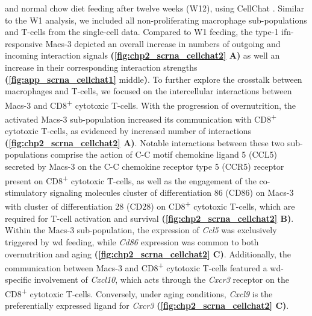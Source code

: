 and normal chow diet feeding after twelve weeks (W12), using CellChat \textbf{\cite{jin_cellchat_2023}}. Similar to the W1 analysis, we included all non-proliferating macrophage sub-populations and T-cells from the single-cell data. Compared to W1 feeding, the type-1 \gls{ifn}-responsive Macs-3 depicted an overall increase in numbers of outgoing and incoming interaction signals \textbf{(\autoref{fig:chp2_scrna_cellchat2} A)} as well an increase in their corresponding interaction strengths \textbf{(\autoref{fig:app_scrna_cellchat1}} middle\textbf{)}. To further explore the crosstalk between macrophages and T-cells, we focused on the intercellular interactions between Macs-3 and CD8\textsuperscript{+} cytotoxic T-cells. With the progression of overnutrition, the activated Macs-3 sub-population increased its communication with CD8\textsuperscript{+} cytotoxic T-cells, as evidenced by increased number of interactions \textbf{(\autoref{fig:chp2_scrna_cellchat2} A)}. Notable interactions between these two sub-populations comprise the action of C-C motif chemokine ligand 5 (CCL5) secreted by Macs-3 on the C-C chemokine receptor type 5 (CCR5) receptor present on CD8\textsuperscript{+} cytotoxic T-cells, as well as the engagement of the co-stimulatory signaling molecules cluster of differentiation 86 (CD86) on Macs-3 with cluster of differentiation 28 (CD28) on CD8\textsuperscript{+} cytotoxic T-cells, which are required for T-cell activation and survival \textbf{(\autoref{fig:chp2_scrna_cellchat2} B)}. Within the Macs-3 sub-population, the expression of \textit{Ccl5} was exclusively triggered by \gls{wd} feeding, while \textit{Cd86} expression was common to both overnutrition and aging \textbf{(\autoref{fig:chp2_scrna_cellchat2} C)}. Additionally, the communication between Macs-3 and CD8\textsuperscript{+} cytotoxic T-cells featured a \gls{wd}-specific involvement of \textit{Cxcl10}, which acts through the \textit{Cxcr3} receptor on the CD8\textsuperscript{+} cytotoxic T-cells. Conversely, under aging conditions, \textit{Cxcl9} is the preferentially expressed ligand for \textit{Cxcr3} \textbf{(\autoref{fig:chp2_scrna_cellchat2} C)}.\\

